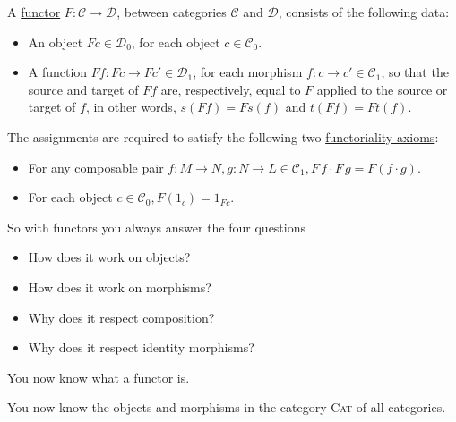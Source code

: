 \documentclass[12pt,compress]{beamer}
\begin{document}
\begin{frame}
\noindent A \ul{functor} $F : \mathcal{C} \rightarrow \mathcal{D}$, between categories $\mathcal{C}$ and $\mathcal{D}$, consists of the
following data:

\begin{itemize}[<.->]
\item An object $Fc\in\mathcal{D}_{0}$, for each object $c \in \mathcal{C}_{0}$.
\item A function $Ff : Fc \rightarrow Fc' \in \mathcal{D}_{1}$, for each morphism $f : c \rightarrow c' \in \mathcal{C}_{1}$, so that the
source and target of $Ff$ are, respectively, equal to $F$ applied to the source or target of $f$, in other words,
$s(Ff) = Fs(f)$ and $t(Ff) = Ft(f)$.
\end{itemize}

\noindent The assignments are required to satisfy the following two \ul{functoriality axioms}:
\begin{itemize}[<.->]
\item For any composable pair $f : M \rightarrow N, g : N \rightarrow L \in \mathcal{C}_{1}, F\,f \cdot F\,g = F(f \cdot g)$.
\item For each object $c \in \mathcal{C}_{0}, F(1_{c}) = 1_{Fc}$.
\end{itemize}

\end{frame}
\begin{frame}
\noindent So with functors you always answer the four questions
\begin{itemize}[<.->]
\item How does it work on objects?
\item How does it work on morphisms?
\item Why does it respect composition?
\item Why does it respect identity morphisms?
\end{itemize}
\end{frame}
\begin{frame}
\begin{centering}
You now know what a functor is.
\end{centering}
\end{frame}
\begin{frame}
\begin{centering}
You now know the objects and morphisms in the category \textsc{Cat} of all categories.
\end{centering}
\end{frame}
\end{document}
